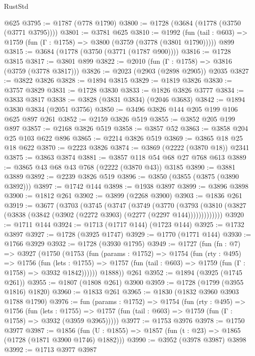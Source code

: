 \begin{lexlean}{RustStd}
\begin{coremodule}
    @625
@3795 := @1787 (@778 @1790)
@3800 := @1728 (@3684 (@1778 (@3750 (@3771 @3795))))
@3801 := @3781 @625
@3810 := @1992
    (fun (tail : @603) => @1759 (fun (Γ : @1758) => @3800 (@3759 (@3778 (@3801 @1790)))))
    @899
@3815 := @3684 (@1778 (@3750 (@3771 (@1787 @900))))
@3816 := @1728 @3815
@3817 := @3801 @899
@3822 := @2010 (fun (Γ : @1758) => @3816 (@3759 (@3778 @3817)))
@3826 := @2023 (@2903 (@2898 @2905)) @2035
@3827 := @3822 @3826
@3828 := @1894 @3815
@3829 := @1819 @3826
@3830 := @3757 @3829
@3831 := @1728 @3830
@3833 := @1826 @3826 @3777
@3834 := @3833 @3817
@3838 := @3828 (@3831 @3834) (@2046 @3683)
@3842 := @1894 @3830 @3834 (@2051 @3756)
@3850 := @3496 @3826 @144 @205 @199 @106 @625 @897 @261
@3852 := @2159 @3826 @519
@3855 := @3852 @205 @199 @897
@3857 := @2168 @3826 @519
@3858 := @3857 @52
@3863 := @3858 @204 @25 @103 @622 @896
@3865 := @2214 @3826 @519
@3869 := @3865 @18 @25 @18 @622
@3870 := @2223 @3826
@3874 := @3869 (@2222 (@3870 @18)) @2341
@3875 := @3863 @3874
@3881 := @3857 @118 @54 @68 @27 @768 @613
@3889 := @3865 @43 @68 @43 @768 (@2222 (@3870 @43)) @3185
@3890 := @3881 @3889
@3892 := @2239 @3826 @519
@3896 := @3850 (@3855 (@3875 (@3890 @3892)))
@3897 := @1742 @144
@3898 := @1938 @3897
@3899 := @3896 @3898
@3900 := @1812 @261
@3902 := @3899 (@2268 @3900)
@3903 := @1836 @261
@3919 := @3677
    (@3703
      (@3745
        (@3747
          (@3749
            (@3770
              (@3793
                (@3810 (@3827 (@3838 (@3842 (@3902 (@2272 @3903) (@2277 (@2297 @144)))))))))))))
@3920 := @1711 @144
@3924 := @1713 (@1717 @144) (@1723 @144)
@3925 := @1732 @3897
@3927 := @1728 (@3925 @1747)
@3929 := @1770 (@1771 @144)
@3930 := @1766 @3929
@3932 := @1728 (@3930 @1795)
@3949 := @1727
    (fun (fn : @7) =>
    @3927
      (@1750
        (@1753
          (fun (params : @1752) =>
          @1754
            (fun (rty : @495) =>
            @1756
              (fun (lets : @1755) =>
              @1757 (fun (tail : @603) => @1759 (fun (Γ : @1758) => @3932 @1842))))))
        @1888))
    @261
@3952 := @1894 (@3925 (@1745 @261))
@3955 := @1807 (@1808 @261) @3900
@3959 := @1728 (@1799 (@3955 @1816) @1820)
@3960 := @1833 @261
@3965 := @1830 (@1832 @3960 @3903 @1788 @1790)
@3976 := fun (params : @1752) =>
  @1754
    (fun (rty : @495) =>
    @1756
      (fun (lets : @1755) =>
      @1757 (fun (tail : @603) => @1759 (fun (Γ : @1758) => @3932 (@3959 @3965)))))
@3977 := @1753 @3976
@3978 := @1750 @3977
@3987 := @1856 (fun (U : @1855) => @1857 (fun (t : @23) => @1865 (@1728 (@1871 @3900 @1746) @1882)))
@3990 := @3952 (@3978 @3987) @3898
@3992 := @1713 @3977 @3987

\end{coremodule}
\end{lexlean}
